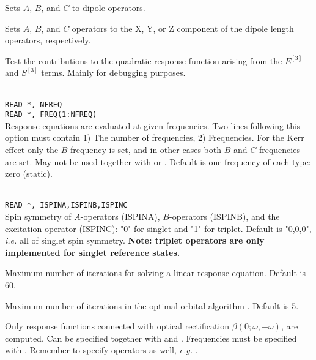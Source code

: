 \begin{description}
\item{}
Sets $A$, $B$, and $C$ to dipole operators.

\item{}
Sets $A$, $B$, and $C$ operators to the X, Y, or Z component of the
dipole length operators, respectively.

\item{}
Test the contributions to the quadratic response function arising from
the $E^{\left[3\right]}$ and $S^{\left[3\right]}$ terms.  Mainly for
debugging purposes.

\item{}\\
\verb|READ *, NFREQ|\\
\verb|READ *, FREQ(1:NFREQ)|\\
Response equations are evaluated at given
frequencies. Two lines
following this option must contain 1) The number of frequencies, 2)
Frequencies.
For the Kerr effect only the $B$-frequency is set,
and in other cases both $B$ and $C$-frequencies are set.
May not be used together with  or .
Default is one frequency of each type: zero (static).

\item{}\\
\verb|READ *, ISPINA,ISPINB,ISPINC|\\
Spin symmetry of $A$-operators (ISPINA), $B$-operators (ISPINB),
and the excitation operator (ISPINC): "0" for singlet and "1" for triplet.
Default is "0,0,0", {\it i.e.\/} all of singlet spin symmetry.
{\bf Note: triplet operators are only implemented for singlet reference states.}
\item{}
Maximum number of iterations for solving a linear response equation.
Default is 60.

\item{}
Maximum number of iterations in the optimal
orbital algorithm
\cite{tuhjahjajpjjcp84}.
Default is 5.

\item{}
Only response functions connected with optical rectification
$\beta(0; \omega,-\omega)$, are computed.
Can be specified together with  and .
Frequencies must be specified with .
Remember to specify operators as well, {\it e.g.\/} .


\end{description}
